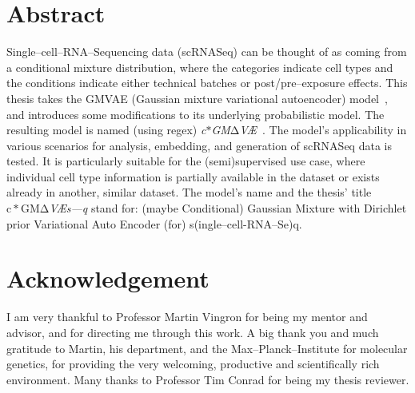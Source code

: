 \documentclass[11pt, a4paper]{report}
\theoremstyle{plain}
\theoremstyle{definition}
\theoremstyle{remark}
\newcommand{\scgmvae}{$\mathrm{c}{\ast}\mathrm{GM\Delta}$V{\AE}s---q}
\newcommand{\gmvae}{c$\ast$GM$\mathrm{\Delta}$V\AE~}
\begin{document}



\chapter*{Abstract}
Single--cell--RNA--Sequencing data (scRNASeq) can be thought of as coming from a conditional mixture distribution, where
the categories indicate cell types and the conditions indicate either technical
batches or post/pre--exposure effects.
This thesis takes
the GMVAE (Gaussian mixture variational autoencoder) model~\cite{dilokthanakul2016deep},
and introduces some modifications to its underlying probabilistic model. 
The resulting model is named (using regex) \emph{\gmvae}.
The model's applicability in various scenarios for analysis, embedding, and generation of scRNASeq
data is tested.
It is particularly suitable for the (semi)supervised use case,
where individual cell type information is partially available
in the dataset or exists already in another, similar dataset.
The model's name and the thesis' title \emph{\scgmvae} stand for:
(maybe Conditional) Gaussian Mixture with Dirichlet
prior Variational Auto Encoder (for) s(ingle--cell-RNA--Se)q.




\chapter*{Acknowledgement}

I am very thankful to Professor Martin Vingron for being my mentor and advisor,
and for directing me through this work. A big thank you and much gratitude to
Martin, his department, and the Max--Planck--Institute for molecular genetics,
for providing the very welcoming, productive and scientifically rich
environment. Many thanks to Professor Tim Conrad for being my thesis 
reviewer.
\end{document}
